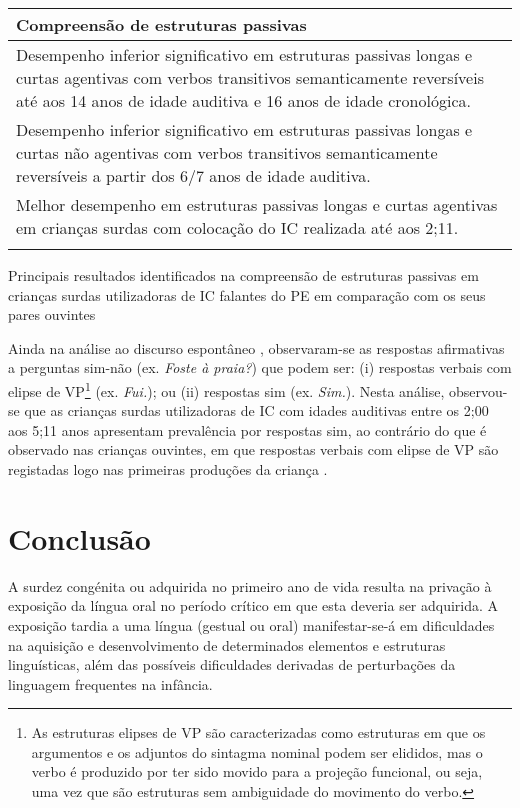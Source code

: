\documentclass[output=paper,colorlinks,citecolor=brown,booklanguage=portuguese]{langscibook}
\begin{document}
\begin{Tabela}
\begin{tabularx}{.8\textwidth}{Q}
  \lsptoprule
  \textbf{Compreensão de estruturas passivas}   \\
\midrule
Desempenho inferior significativo em estruturas passivas longas
e curtas agentivas com verbos transitivos semanticamente reversíveis até aos 14 anos de
idade auditiva e 16 anos de idade cronológica.\\
\tablevspace

Desempenho inferior significativo em estruturas passivas longas
e curtas não agentivas com verbos transitivos semanticamente reversíveis a partir dos 6/7
anos de idade auditiva. \\
\tablevspace


Melhor desempenho em estruturas passivas longas e curtas
agentivas em crianças surdas com colocação do IC realizada até
aos 2;11.\\
\lspbottomrule
\end{tabularx}

\caption{{Principais resultados identificados na compreensão de estruturas passivas em crianças surdas utilizadoras de IC falantes do PE em comparação com os seus pares ouvintes}}
\label{tab:tabela4}
\end{Tabela}

Ainda na análise ao discurso espontâneo \citep{Costa2016a}, observaram-se as respostas afirmativas a perguntas sim-não (ex. \emph{Foste à praia?}) que podem ser: (i) respostas verbais com elipse de VP\footnote{As estruturas elipses de VP são caracterizadas como estruturas em que os argumentos e os adjuntos do sintagma nominal podem ser elididos, mas o verbo é produzido por ter sido movido para a projeção funcional, ou seja, uma vez que são estruturas sem ambiguidade do movimento do verbo.} (ex. \emph{Fui.}); ou (ii) respostas sim (ex. \emph{Sim.}). Nesta análise, observou-se que as crianças surdas utilizadoras de IC com idades auditivas entre os 2;00 aos 5;11 anos apresentam prevalência por respostas sim, ao contrário do que é observado nas crianças ouvintes, em que respostas verbais com elipse de VP são registadas logo nas primeiras produções da criança \citep{Santos2009a}.

\section{Conclusão}

A surdez congénita ou adquirida no primeiro ano de vida resulta na privação à exposição da língua oral no período crítico em que esta deveria ser adquirida. A exposição tardia a uma língua (gestual ou oral) manifestar-se-á em dificuldades na aquisição e desenvolvimento de determinados elementos e estruturas linguísticas, além das possíveis dificuldades derivadas de perturbações da linguagem frequentes na infância.
\end{document}
